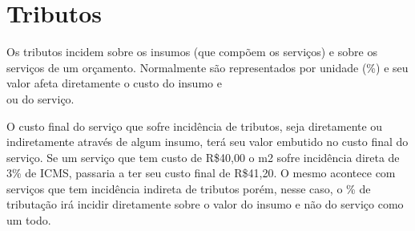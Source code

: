 \chapter{Tributos}

Os tributos incidem sobre os insumos (que compõem os serviços) e sobre os serviços de um orçamento. Normalmente são representados por unidade (\%) e seu valor afeta diretamente o custo do insumo e\\ou do serviço.

O custo final do serviço que sofre incidência de tributos, seja diretamente ou indiretamente através de algum insumo, terá seu valor embutido no custo final do serviço. Se um serviço que tem custo de R\$40,00 o m2 sofre incidência direta de 3\% de ICMS, passaria a ter seu custo final de R\$41,20. O mesmo acontece com serviços que tem incidência indireta de tributos porém, nesse caso, o \% de tributação irá incidir diretamente sobre o valor do insumo e não do serviço como um todo.